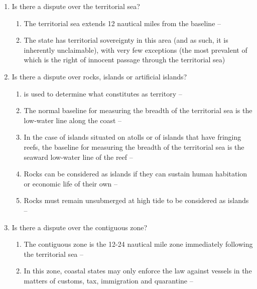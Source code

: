 \begin{enumerate}
\begin{enumerate}
\begin{enumerate}
        \end{enumerate}
        \item Is there a dispute over the territorial sea?
        \begin{enumerate}
            \item The territorial sea extends 12 nautical miles from the baseline -- 
            \item The state has territorial sovereignty in this area (and as such, it is inherently unclaimable), with very few exceptions (the most prevalent of which is the right of innocent passage through the territorial sea)
        \end{enumerate}
        \item Is there a dispute over rocks, islands or artificial islands?
        \begin{enumerate}
            \item {} is used to determine what constitutes as territory -- 
            \item The normal baseline for measuring the breadth of the territorial sea is the low-water line along the coast -- 
            \item In the case of islands situated on atolls or of islands that have fringing reefs, the baseline for measuring the breadth of the territorial sea is the seaward low-water line of the reef -- 
            \item Rocks can be considered as islands if they can sustain human habitation or economic life of their own -- 
            \item Rocks must remain unsubmerged at high tide to be considered as islands -- 
        \end{enumerate}
        \item Is there a dispute over the contiguous zone?
        \begin{enumerate}
            \item The contiguous zone is the 12-24 nautical mile zone immediately following the territorial sea -- 
            \item In this zone, coastal states may only enforce the law against vessels in the matters of customs, tax, immigration and quarantine -- 

\end{enumerate}
\end{enumerate}
\end{enumerate}
